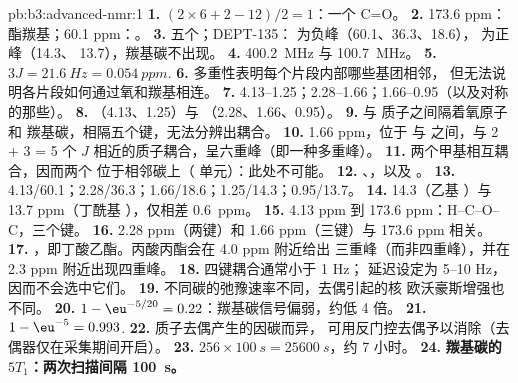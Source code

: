 \begin{solution}{pb:b3:advanced-nmr:1}
\textbf{1.} $(2 \times 6 + 2 - 12)/2 = 1$：一个 C=O。
\textbf{2.} 173.6 ppm：酯羰基；60.1 ppm：。
\textbf{3.} 五个；DEPT-135： 为负峰（60.1、36.3、18.6）， 为正峰（14.3、
13.7），羰基碳不出现。
\textbf{4.} \qty{400.2}{MHz} 与 \qty{100.7}{MHz}。
\textbf{5.} $3J = \qty{21.6}{Hz} = \qty{0.054}{ppm}$.
\textbf{6.} 多重性表明每个片段内部哪些基团相邻，
但无法说明各片段如何通过氧和羰基相连。
\textbf{7.} 4.13--1.25；2.28--1.66；1.66--0.95（以及对称的那些）。
\textbf{8.} （4.13、1.25）与 （2.28、1.66、0.95）。
\textbf{9.}  与  质子之间隔着氧原子和
羰基碳，相隔五个键，无法分辨出耦合。
\textbf{10.} 1.66 ppm，位于  与  之间，与 2 + 3 = 5 个
$J$ 相近的质子耦合，呈六重峰（即一种多重峰）。
\textbf{11.} 两个甲基相互耦合，因而两个  位于相邻碳上（ 单元）：此处不可能。
\textbf{12.} 、，以及 。
\textbf{13.} 4.13/60.1；2.28/36.3；1.66/18.6；1.25/14.3；0.95/13.7。
\textbf{14.} 14.3（乙基 ）与 13.7 ppm（丁酰基 ），仅相差 \qty{0.6}{ppm}。
\textbf{15.} 4.13 ppm 到 173.6 ppm：H--C--O--C，三个键。
\textbf{16.} 2.28 ppm（两键）和 1.66 ppm（三键）与 173.6 ppm 相关。
\textbf{17.} ，即丁酸乙酯。丙酸丙酯会在 4.0 ppm 附近给出
 三重峰（而非四重峰），并在 2.3 ppm 附近出现四重峰。
\textbf{18.} 四键耦合通常小于 1 Hz； 延迟设定为
5--10 Hz，因而不会选中它们。
\textbf{19.} 不同碳的弛豫速率不同，去偶引起的核
欧沃豪斯增强也不同。
\textbf{20.} $1 - \eu^{-5/20} = 0.22$：羰基碳信号偏弱，约低 4 倍。
\textbf{21.} $1 - \eu^{-5} = 0.993$.
\textbf{22.} 质子去偶产生的因碳而异，
可用反门控去偶予以消除（去偶器仅在采集期间开启）。
\textbf{23.} $256 \times \qty{100}{s} = \qty{25600}{s}$，约 7 小时。
\textbf{24.} \textbf{羰基碳的 $5T_1$：两次扫描间隔 \qty{100}{s}。}
\end{solution}
